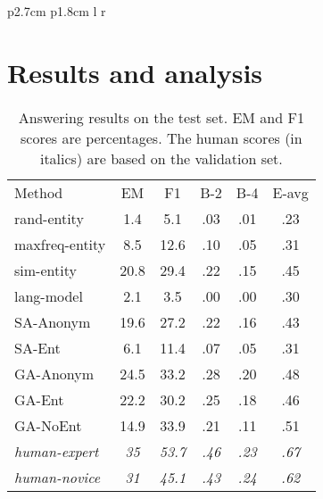 \documentclass[11pt,a4paper]{article}
\begin{document}
\begin{table}[t]
\begin{tabular}{p{2.7cm} p{1.8cm} l r}
{\section{Results and analysis}
\begin{table}[t]
\centering
\begin{tabular}{l c c c c c}
Method & EM & F1 & B-2 & B-4 & E-avg \\ \cmidrule(lr){1-6}
rand-entity & 1.4 & 5.1 & .03 & .01 & .23 \\ maxfreq-entity & 8.5 & 12.6 & .10 & .05 & .31 \\ sim-entity & 20.8 & 29.4 & .22 & .15 & .45 \\ lang-model & 2.1 & 3.5 & .00 & .00 & .30 \\
\cmidrule(lr){1-6}
SA-Anonym & 19.6 & 27.2 & .22 & .16 & .43 \\ SA-Ent & 6.1 & 11.4 & .07 & .05 & .31 \\ \cmidrule(lr){1-6}
GA-Anonym & 24.5 & 33.2 & .28 & .20 & .48  \\ GA-Ent & 22.2& 30.2 & .25 & .18 & .46  \\ GA-NoEnt & 14.9 & 33.9 & .21 & .11 & .51 \\\cmidrule(lr){1-6}
\textit{human-expert}  & \textit{35} & \textit{53.7} & \textit{.46} & \textit{.23} & \textit{.67} \\ \textit{human-novice} & \textit{31} & \textit{45.1} & \textit{.43} & \textit{.24} & \textit{.62} \\ \end{tabular}

\caption{Answering results on the test set. EM and F1 scores are percentages. The human scores (in italics) are based on the validation set.}\label{tab:test}
\end{table}

}
\end{tabular}
\end{table}
\end{document}
